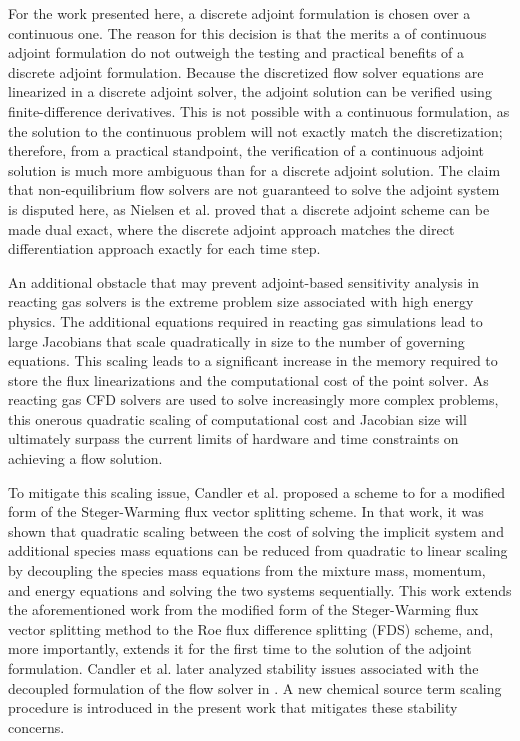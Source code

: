 For the work presented here, a discrete adjoint formulation is chosen over a
continuous one.  The reason for this decision is that the merits a of continuous
adjoint formulation do not outweigh the testing and practical benefits of a
discrete adjoint formulation.  Because the discretized flow solver equations are
linearized in a discrete adjoint solver, the adjoint solution can be verified
using finite-difference derivatives.  This is not possible with a continuous
formulation, as the solution to the continuous problem will not exactly match
the discretization; therefore, from a practical standpoint, the verification of
a continuous adjoint solution is much more ambiguous than for a discrete adjoint
solution.  The claim that non-equilibrium flow solvers are not guaranteed to
solve the adjoint system is disputed here, as Nielsen et
al.\cite{nielsen2004implicit} proved that a discrete adjoint scheme can be made
dual exact, where the discrete adjoint approach matches the direct
differentiation approach exactly for each time step.

An additional obstacle that may prevent adjoint-based sensitivity analysis in
reacting gas solvers is the extreme problem size associated with high energy
physics.  The additional equations required in reacting gas simulations lead to
large Jacobians that scale quadratically in size to the number of governing
equations.  This scaling leads to a significant increase in the memory required
to store the flux linearizations and the computational cost of the point solver.
As reacting gas CFD solvers are used to solve increasingly more complex
problems, this onerous quadratic scaling of computational cost and Jacobian size
will ultimately surpass the current limits of hardware and time constraints on
achieving a flow solution\cite{fischer}.

To mitigate this scaling issue, Candler et al.\cite{candler} proposed a scheme
to for a modified form of the Steger-Warming flux vector splitting
scheme\cite{MacCormack,Steger}. In that work, it was shown that quadratic
scaling between the cost of solving the implicit system and additional species
mass equations can be reduced from quadratic to linear scaling by decoupling the
species mass equations from the mixture mass, momentum, and energy equations and
solving the two systems sequentially.  This work extends the aforementioned work
from the modified form of the Steger-Warming flux vector splitting method to the
Roe flux difference splitting (FDS) scheme, and, more importantly, extends it
for the first time to the solution of the adjoint formulation.  Candler et
al.\cite{candler2013analysis} later analyzed stability issues associated with
the decoupled formulation of the flow solver in \cite{candler}.  A new chemical
source term scaling procedure is introduced in the present work that mitigates
these stability concerns.

